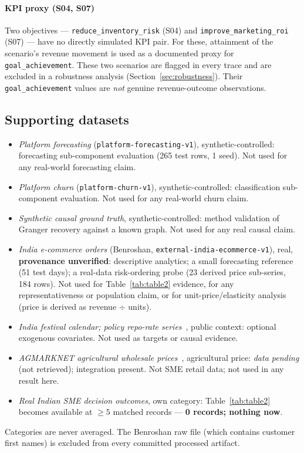 \documentclass[conference]{IEEEtran}
\newcommand{\code}[1]{\texttt{#1}}
\begin{document}
\paragraph{KPI proxy (S04, S07)}
Two objectives --- \code{reduce\_inventory\_risk} (S04) and
\code{improve\_marketing\_roi} (S07) --- have no directly simulated KPI pair.
For these, attainment of the scenario's revenue movement is used as a documented
proxy for \code{goal\_achievement}. These two scenarios are flagged in every
trace and are excluded in a robustness analysis
(Section~\ref{sec:robustness}). Their \code{goal\_achievement} values are
\emph{not} genuine revenue-outcome observations.

\subsection{Supporting datasets}
\begin{itemize}
\item \emph{Platform forecasting} (\code{platform-forecasting-v1}),
synthetic-controlled: forecasting sub-component evaluation (265 test rows, 1
seed). Not used for any real-world forecasting claim.
\item \emph{Platform churn} (\code{platform-churn-v1}), synthetic-controlled:
classification sub-component evaluation. Not used for any real-world churn claim.
\item \emph{Synthetic causal ground truth}, synthetic-controlled: method
validation of Granger recovery against a known graph. Not used for any real
causal claim.
\item \emph{India e-commerce orders} (Benroshan,
\code{external-india-ecommerce-v1}), real, \textbf{provenance unverified}:
descriptive analytics; a small forecasting reference (51 test days); a real-data
risk-ordering probe (23 derived price sub-series, 184 rows). Not used for
Table~\ref{tab:table2} evidence, for any representativeness or population claim,
or for unit-price/elasticity analysis (price is derived as revenue $\div$ units).
\item \emph{India festival calendar; policy repo-rate series}~\cite{RBIDBIE},
public context: optional exogenous covariates. Not used as targets or causal
evidence.
\item \emph{AGMARKNET agricultural wholesale prices}~\cite{AGMARKNET},
agricultural price: \emph{data pending} (not retrieved); integration present.
Not SME retail data; not used in any result here.
\item \emph{Real Indian SME decision outcomes}, own category:
Table~\ref{tab:table2} becomes available at $\geq 5$ matched records ---
\textbf{0 records; nothing now}.
\end{itemize}
Categories are never averaged. The Benroshan raw file (which contains customer
first names) is excluded from every committed processed artifact.
\end{document}
